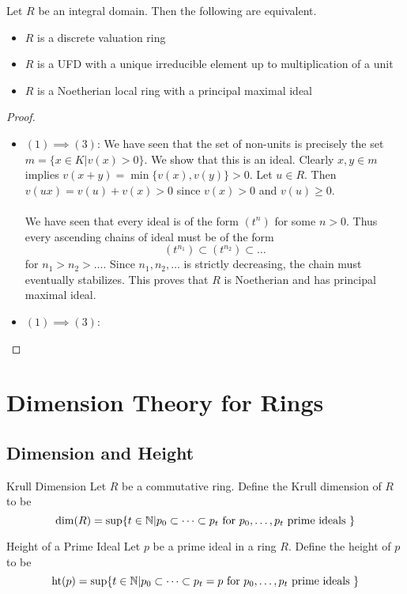 \documentclass[a4paper]{article}
\begin{document}
\begin{prp}{}{} Let $R$ be an integral domain. Then the following are equivalent. 
\begin{itemize}
\item $R$ is a discrete valuation ring
\item $R$ is a UFD with a unique irreducible element up to multiplication of a unit
\item $R$ is a Noetherian local ring with a principal maximal ideal
\end{itemize} \tcbline
\begin{proof}~\\
\begin{itemize}
\item $(1)\implies(3)$: We have seen that the set of non-units is precisely the set $m=\{x\in K|v(x)>0\}$. We show that this is an ideal. Clearly $x,y\in m$ implies $v(x+y)=\min\{v(x),v(y)\}>0$. Let $u\in R$. Then $v(ux)=v(u)+v(x)>0$ since $v(x)>0$ and $v(u)\geq 0$. \\~\\
We have seen that every ideal is of the form $(t^n)$ for some $n>0$. Thus every ascending chains of ideal must be of the form $$(t^{n_1})\subset(t^{n_2})\subset\dots$$ for $n_1>n_2>\dots$. Since $n_1,n_2,\dots$ is strictly decreasing, the chain must eventually stabilizes. This proves that $R$ is Noetherian and has principal maximal ideal. 
\item $(1)\implies(3)$:
\end{itemize}
\end{proof}
\end{prp}


\pagebreak
\section{Dimension Theory for Rings}
\subsection{Dimension and Height}
\begin{defn}{Krull Dimension}{} Let $R$ be a commutative ring. Define the Krull dimension of $R$ to be $$\dim(R)=\sup\{t\in\mathbb{N}|p_0\subset\dots\subset p_t\text{ for }p_0,\dots,p_t\text{ prime ideals }\}$$
\end{defn}

\begin{defn}{Height of a Prime Ideal}{} Let $p$ be a prime ideal in a ring $R$. Define the height of $p$ to be $$\text{ht}(p)=\sup\{t\in\mathbb{N}|p_0\subset\dots\subset p_t=p\text{ for }p_0,\dots,p_t\text{ prime ideals }\}$$
\end{defn}
\end{document}
